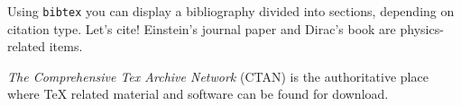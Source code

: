 \documentclass[12pt]{article}
\begin{document}
Using \texttt{bibtex} you can display a bibliography divided
into sections, depending on citation type. Let's cite! Einstein's
journal paper \cite{einstein} and Dirac's book \cite{dirac} are
physics-related items.


\textit{The Comprehensive Tex Archive Network} (CTAN)
\cite{ctan} is the authoritative place where TeX related material and software can be found for download.




\end{document}
